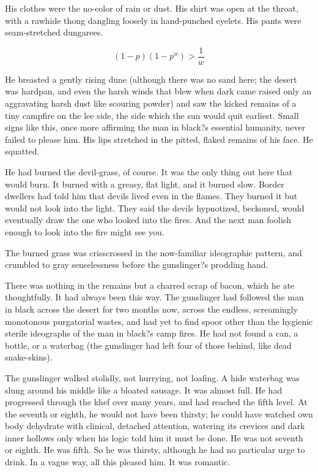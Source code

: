 \documentclass[
11pt,%
tightenlines,%
twoside,%
onecolumn,%
nofloats,%
nobibnotes,%
nofootinbib,%
superscriptaddress,%
noshowpacs,%
centertags]%
{revtex4}
\begin{document}
His clothes were the no-color of rain or dust. His shirt was open at the throat, with a rawhide thong dangling loosely in hand-punched eyelets. His pants were seam-stretched dungarees.

\begin{equation}
(1 - p)(1 - p^w) > \frac{1}{w}
\end{equation}

He breasted a gently rising dune (although there was no sand here; the desert was hardpan, and even the harsh winds that blew when dark came raised only an aggravating harsh dust like scouring powder) and saw the kicked remains of a tiny campfire on the lee side, the side which the sun would quit earliest. Small signs like this, once more affirming the man in black?s essential humanity, never failed to please him. His lips stretched in the pitted, flaked remains of his face. He squatted.

He had burned the devil-grass, of course. It was the only thing out here that would burn. It burned with a greasy, flat light, and it burned slow. Border dwellers had told him that devils lived even in the flames. They burned it but would not look into the light. They said the devils hypnotized, beckoned, would eventually draw the one who looked into the fires. And the next man foolish enough to look into the fire might see you.

The burned grass was crisscrossed in the now-familiar ideographic pattern, and crumbled to gray senselessness before the gunslinger?s prodding hand. 

There was nothing in the remains but a charred scrap of bacon, which he ate thoughtfully. It had always been this way. The gunslinger had followed the man in black across the desert for two months now, across the endless, screamingly monotonous purgatorial wastes, and had yet to find spoor other than the hygienic sterile ideographs of the man in black?s camp fires. He had not found a can, a bottle, or a waterbag (the gunslinger had left four of those behind, like dead snake-skins).

The gunslinger walked stolidly, not hurrying, not loafing. A hide waterbag was slung around his middle like a bloated sausage. It was almost full. He had progressed through the khef over many years, and had reached the fifth level. At the seventh or eighth, he would not have been thirsty; he could have watched own body dehydrate with clinical, detached attention, watering its crevices and dark inner hollows only when his logic told him it must be done. He was not seventh or eighth. He was fifth. So he was thirsty, although he had no particular urge to drink. In a vague way, all this pleased him. It was romantic.
\end{document}
